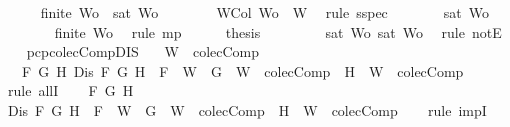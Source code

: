 \begin{isabellebody}
\ \ \ \ \isamarkupfalse%
\ {\isachardoublequoteopen}finite\ Wo{\isacharprime}\ {\isasymlongrightarrow}\ sat\ Wo{\isacharprime}{\isachardoublequoteclose}\isanewline
\ \ \ \ \ \ \isamarkupfalse%
\ WCol\ {\isacartoucheopen}Wo{\isacharprime}\ {\isasymsubseteq}\ W{\isacartoucheclose}\ \isamarkupfalse%
\ {\isacharparenleft}rule\ sspec{\isacharparenright}\isanewline
\ \ \ \ \isamarkupfalse%
\ \isamarkupfalse%
\ {\isachardoublequoteopen}sat\ Wo{\isacharprime}{\isachardoublequoteclose}\isanewline
\ \ \ \ \ \ \isamarkupfalse%
\ {\isacartoucheopen}finite\ Wo{\isacharprime}{\isacartoucheclose}\ \isamarkupfalse%
\ {\isacharparenleft}rule\ mp{\isacharparenright}\isanewline
\ \ \ \ \isamarkupfalse%
\ {\isacharquery}thesis\isanewline
\ \ \ \ \ \ \isamarkupfalse%
\ {\isacartoucheopen}{\isasymnot}\ sat\ Wo{\isacharprime}{\isacartoucheclose}\ {\isacartoucheopen}sat\ Wo{\isacharprime}{\isacartoucheclose}\ \isamarkupfalse%
\ {\isacharparenleft}rule\ notE{\isacharparenright}\isanewline
\ \ \isamarkupfalse%
\isanewline
{}\isamarkupfalse%
%
\endisatagproof
{\isafoldproof}%
%
\isadelimproof
\isanewline
%
\endisadelimproof
\isanewline
{}\isamarkupfalse%
\ pcp{\isacharunderscore}colecComp{\isacharunderscore}DIS{\isacharcolon}\isanewline
\ \ \ {\isachardoublequoteopen}W\ {\isasymin}\ colecComp{\isachardoublequoteclose}\isanewline
\ \ \ {\isachardoublequoteopen}{\isasymforall}F\ G\ H{\isachardot}\ Dis\ F\ G\ H\ {\isasymlongrightarrow}\ F\ {\isasymin}\ W\ {\isasymlongrightarrow}\ {\isacharbraceleft}G{\isacharbraceright}\ {\isasymunion}\ W\ {\isasymin}\ colecComp\ {\isasymor}\ {\isacharbraceleft}H{\isacharbraceright}\ {\isasymunion}\ W\ {\isasymin}\ colecComp{\isachardoublequoteclose}\isanewline
%
\isadelimproof
%
\endisadelimproof
%
\isatagproof
{}\isamarkupfalse%
\ {\isacharparenleft}rule\ allI{\isacharparenright}{\isacharplus}\isanewline
\ \ \isamarkupfalse%
\ F\ G\ H\isanewline
\ \ \isamarkupfalse%
\ {\isachardoublequoteopen}Dis\ F\ G\ H\ {\isasymlongrightarrow}\ F\ {\isasymin}\ W\ {\isasymlongrightarrow}\ {\isacharbraceleft}G{\isacharbraceright}\ {\isasymunion}\ W\ {\isasymin}\ colecComp\ {\isasymor}\ {\isacharbraceleft}H{\isacharbraceright}\ {\isasymunion}\ W\ {\isasymin}\ colecComp{\isachardoublequoteclose}\isanewline
\ \ \isamarkupfalse%
\ {\isacharparenleft}rule\ impI{\isacharparenright}{\isacharplus}\isanewline

\end{isabellebody}
